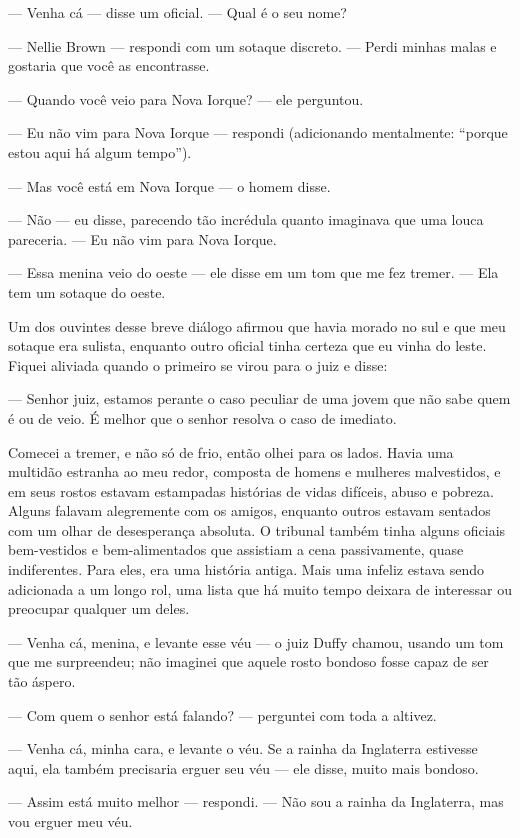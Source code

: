 --- Venha cá --- disse um oficial. --- Qual é o seu nome?

--- Nellie Brown --- respondi com um sotaque discreto. --- Perdi minhas
malas e gostaria que você as encontrasse.

--- Quando você veio para Nova Iorque? --- ele perguntou.

--- Eu não vim para Nova Iorque --- respondi (adicionando mentalmente:
``porque estou aqui há algum tempo'').

--- Mas você está em Nova Iorque --- o homem disse.

--- Não --- eu disse, parecendo tão incrédula quanto imaginava que uma
louca pareceria. --- Eu não vim para Nova Iorque.

--- Essa menina veio do oeste --- ele disse em um tom que me fez tremer.
--- Ela tem um sotaque do oeste.

Um dos ouvintes desse breve diálogo afirmou que havia morado no sul e
que meu sotaque era sulista, enquanto outro oficial tinha certeza que eu
vinha do leste. Fiquei aliviada quando o primeiro se virou para o juiz e
disse:

--- Senhor juiz, estamos perante o caso peculiar de uma jovem que não
sabe quem é ou de veio. É melhor que o senhor resolva o caso de
imediato.

Comecei
a tremer, e não só de frio, então olhei para os lados. Havia uma
multidão estranha ao meu redor, composta de homens e mulheres malvestidos, 
e em seus rostos estavam estampadas histórias de vidas
difíceis, abuso e pobreza. Alguns falavam alegremente com os amigos,
enquanto outros estavam sentados com um olhar de desesperança absoluta.
O tribunal também tinha alguns oficiais bem-vestidos e bem-alimentados
que assistiam a cena passivamente, quase indiferentes. Para eles, era
uma história antiga. Mais uma infeliz estava sendo adicionada a um longo
rol, uma lista que há muito tempo deixara de interessar ou preocupar
qualquer um deles.

--- Venha cá, menina, e levante esse véu --- o juiz Duffy chamou, usando
um tom que me surpreendeu; não imaginei que aquele rosto bondoso fosse
capaz de ser tão áspero.

--- Com quem o senhor está falando? --- perguntei com toda a altivez.

--- Venha cá, minha cara, e levante o véu. Se a rainha da Inglaterra
estivesse aqui, ela também precisaria erguer seu véu --- ele disse,
muito mais bondoso.

--- Assim está muito melhor --- respondi. --- Não sou a rainha da
Inglaterra, mas vou erguer meu véu.

